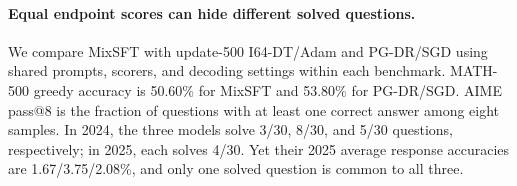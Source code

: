 \paragraph{Equal endpoint scores can hide different solved questions.}
We compare MixSFT with update-500 I64-DT/Adam and PG-DR/SGD using shared prompts, scorers, and decoding settings within each benchmark. MATH-500 greedy accuracy is 50.60\% for MixSFT and 53.80\% for PG-DR/SGD. AIME pass@8 is the fraction of questions with at least one correct answer among eight samples. In 2024, the three models solve 3/30, 8/30, and 5/30 questions, respectively; in 2025, each solves 4/30. Yet their 2025 average response accuracies are 1.67/3.75/2.08\%, and only one solved question is common to all three.

\FloatBarrier
